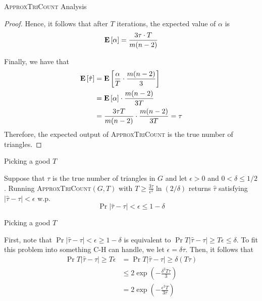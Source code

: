 \begin{frame}{\textsc{ApproxTriCount} Analysis}
  \begin{proof}
    Hence, it follows that after \(T\) iterations, the expected value of
    \(\alpha\) is
    \[ \mathbf{E}\left[\alpha\right] = \frac{3\tau \cdot T}{m(n-2)} \] 

    Finally, we have that
    \[
    \begin{aligned}
      \mathbf{E}\left[\hat{\tau}\right] &= \mathbf{E}\left[\frac{\alpha}{T} \cdot \frac{m(n-2)}{3}\right] \\
             &= \mathbf{E}\left[\alpha\right] \cdot \frac{m(n-2)}{3T} \\
             &= \frac{3\tau T}{m(n-2)} \cdot \frac{m(n-2)}{3T} = \tau
    \end{aligned}
    \]
    Therefore, the expected output of
    \textsc{ApproxTriCount} is the true number of triangles.
  \end{proof}
\end{frame}

\begin{frame}{Picking a good \(T\)}
  \begin{theorem}
    Suppose that \(\tau\) is the true number of triangles in \(G\) and
    let \(\epsilon > 0\) and \(0 < \delta \leq 1/2\). 
    Running \textsc{ApproxTriCount}\((G, T)\) with
    \(T \geq \frac{3\tau}{\epsilon^2}\ln(2/\delta)\) returns \(\hat \tau\) 
    satisfying \(|\hat \tau - \tau| < \epsilon\) w.p.
    \[ \Pr{|\hat\tau - \tau| < \epsilon} \leq 1 - \delta \]
  \end{theorem}
\end{frame}

\begin{frame}{Picking a good \(T\)}
  \begin{proofs}
    First, note that \(\Pr{|\hat\tau - \tau| < \epsilon} \geq 1 - \delta\) is 
    equivalent to \(\Pr{T|\hat\tau - \tau| \geq T\epsilon} \leq \delta\). To
    fit this problem into something C-H can handle, we let \(\epsilon =
    \delta\tau\). Then, it follows that
    \[
      \begin{aligned}
        \Pr{T|\hat\tau - \tau| \geq T\epsilon}
          &= \Pr{T|\hat\tau - \tau| \geq \delta(T\tau)} \\
          &\leq 2\exp\left(-\frac{\delta^2 T\tau}{3}\right) \\
          &= 2\exp\left(-\frac{\epsilon^2 T}{3\tau}\right)
      \end{aligned}
    \]
  \end{proofs}
\end{frame}

